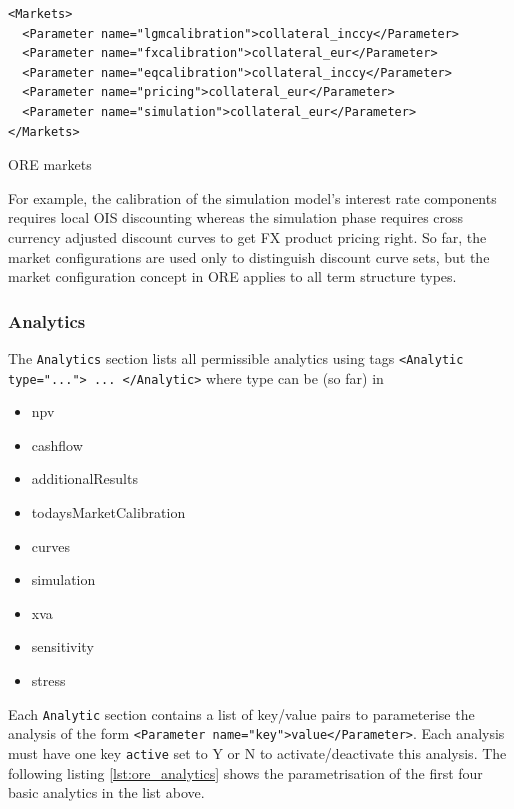 \documentclass[12pt, a4paper]{article}
\begin{document}
{\begin{listing}[H]
\begin{verbatim}
<Markets>
  <Parameter name="lgmcalibration">collateral_inccy</Parameter>
  <Parameter name="fxcalibration">collateral_eur</Parameter>
  <Parameter name="eqcalibration">collateral_inccy</Parameter>
  <Parameter name="pricing">collateral_eur</Parameter>
  <Parameter name="simulation">collateral_eur</Parameter>
</Markets>
\end{verbatim}
\caption{ORE markets}
\label{lst:ore_markets}
\end{listing}

For example, the calibration of the simulation model's interest rate components requires local OIS discounting whereas
the simulation phase requires cross currency adjusted discount curves to get FX product pricing right. So far, the
market configurations are used only to distinguish discount curve sets, but the market configuration concept in ORE
applies to all term structure types.

\subsubsection{Analytics}\label{sec:analytics}

The {\tt Analytics} section lists all permissible analytics using tags {\tt <Analytic type="..."> ... </Analytic>} where
type can be (so far) in
\begin{itemize}
\item npv
\item cashflow
\item additionalResults
\item todaysMarketCalibration
\item curves
\item simulation
\item xva
\item sensitivity
\item stress
\end{itemize}

Each {\tt Analytic} section contains a list of key/value pairs to parameterise the analysis of the form {\tt <Parameter
  name="key">value</Parameter>}. Each analysis must have one key {\tt active} set to Y or N to activate/deactivate this
analysis.  The following listing \ref{lst:ore_analytics} shows the parametrisation of the first four basic analytics in
the list above.

}
\end{document}
